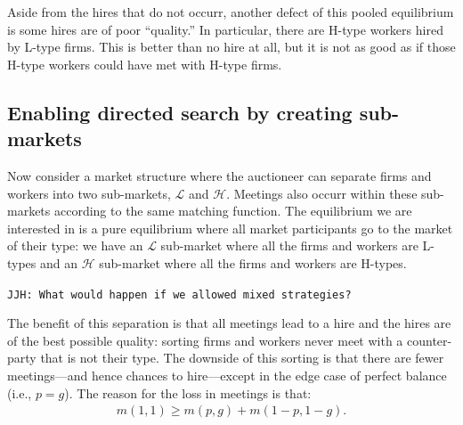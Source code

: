 \documentclass[12pt]{article}
\newcommand{\Lsm}{$\mathcal{L}$}
\newcommand{\Hsm}{$\mathcal{H}$}
\begin{document}
Aside from the hires that do not occurr, another defect of this pooled equilibrium is some hires are of poor ``quality.''
In particular, there are H-type workers hired by L-type firms.
This is better than no hire at all, but it is not as good as if those H-type workers could have met with H-type firms. 



\subsection{Enabling directed search by creating sub-markets}
Now consider a market structure where the auctioneer can separate firms and workers into two sub-markets, \Lsm{} and \Hsm{}.
Meetings also occurr within these sub-markets according to the same matching function. 
The equilibrium we are interested in is a pure equilibrium where all market participants go to the market of their type:
we have an \Lsm{} sub-market where all the firms and workers are L-types and an \Hsm{} sub-market where all the firms and workers are H-types.

\verb+JJH: What would happen if we allowed mixed strategies?+

The benefit of this separation is that all meetings lead to a hire and the hires are of the best possible quality:
sorting firms and workers never meet with a counter-party that is not their type.
The downside of this sorting is that there are fewer meetings---and hence chances to hire---except in the edge case of perfect balance (i.e., $p = g$). 
The reason for the loss in meetings is that:
\begin{align*}
  m(1,1) \ge m(p,g) + m(1-p, 1-g). 
\end{align*}
\end{document}
